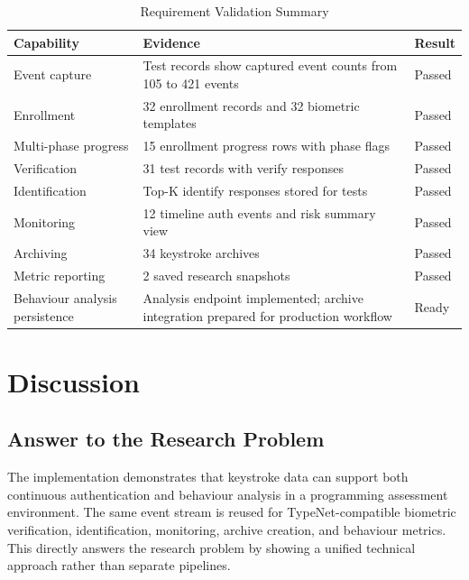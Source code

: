 \begin{table}[H]
  \centering
  \caption{Requirement Validation Summary}
  \label{tab:req-validation}
  \begin{singlespace}
  \begin{tabularx}{\textwidth}{@{}p{4.6cm}p{6.4cm}p{2.2cm}@{}}
    \toprule
    \textbf{Capability} & \textbf{Evidence} & \textbf{Result} \\
    \midrule
    Event capture & Test records show captured event counts from 105 to 421 events & Passed \\
    Enrollment & 32 enrollment records and 32 biometric templates & Passed \\
    Multi-phase progress & 15 enrollment progress rows with phase flags & Passed \\
    Verification & 31 test records with verify responses & Passed \\
    Identification & Top-K identify responses stored for tests & Passed \\
    Monitoring & 12 timeline auth events and risk summary view & Passed \\
    Archiving & 34 keystroke archives & Passed \\
    Metric reporting & 2 saved research snapshots & Passed \\
    Behaviour analysis persistence & Analysis endpoint implemented; archive integration prepared for production workflow & Ready \\
    \bottomrule
  \end{tabularx}
  \end{singlespace}
\end{table}

\section{Discussion}
\label{sec:discussion}

\subsection{Answer to the Research Problem}
\label{subsec:answer-problem}

The implementation demonstrates that keystroke data can support both continuous authentication and behaviour analysis in a programming assessment environment. The same event stream is reused for TypeNet-compatible biometric verification, identification, monitoring, archive creation, and behaviour metrics. This directly answers the research problem by showing a unified technical approach rather than separate pipelines.


